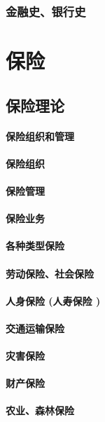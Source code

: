 \documentclass[UTF8]{../../RepresentationUniverse}
\begin{document}
\subsection{金融史、银行史}




    
\chapter{保险}
\section{保险理论}
\subsubsection{保险组织和管理}
\subsubsection{保险组织}
\subsubsection{保险管理}
\subsubsection{保险业务}
\subsubsection{各种类型保险}
\subsubsection{劳动保险、社会保险}
\subsubsection{人身保险 (人寿保险 )}
\subsubsection{交通运输保险}
\subsubsection{灾害保险}
\subsubsection{财产保险}
\subsubsection{农业、森林保险}
\end{document}
